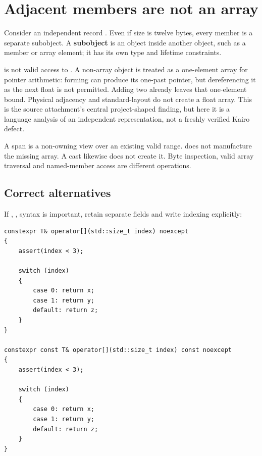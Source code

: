 \section{Adjacent members are not an array}\label{01-foundations-i-ch003-adjacent-members-are-not-an-array}

\hypertarget{01-foundations-i-ch003-adjacent-members-are-not-an-array}{}

Consider an independent record . Even if size is twelve bytes, every member is a separate subobject. A \textbf{subobject} is an object inside another object, such as a member or array element; it has its own type and lifetime constraints.

 is not valid access to . A non-array object is treated as a one-element array for pointer arithmetic: forming  can produce its one-past pointer, but dereferencing it as the next float is not permitted. Adding two already leaves that one-element bound. Physical adjacency and standard-layout do not create a float array. This is the source attachment's central project-shaped finding, but here it is a language analysis of an independent representation, not a freshly verified Kairo defect.

A span is a non-owning view over an existing valid range.  does not manufacture the missing array. A cast likewise does not create it. Byte inspection, valid array traversal and named-member access are different operations.

\subsection{Correct alternatives}\label{01-foundations-i-ch003-correct-alternatives}

\hypertarget{01-foundations-i-ch003-correct-alternatives}{}

If , ,  syntax is important, retain separate fields and write indexing explicitly:

\begin{verbatim}
constexpr T& operator[](std::size_t index) noexcept
{
    assert(index < 3);

    switch (index)
    {
        case 0: return x;
        case 1: return y;
        default: return z;
    }
}

constexpr const T& operator[](std::size_t index) const noexcept
{
    assert(index < 3);

    switch (index)
    {
        case 0: return x;
        case 1: return y;
        default: return z;
    }
}
\end{verbatim}

